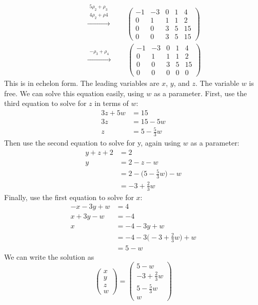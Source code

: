 \documentclass[11pt]{article}
\theoremstyle{definition}
\def\rowop#1{\qquad\xrightarrow{\begin{matrix}#1\end{matrix}}\qquad}
\begin{document}
\begin{align*}
  &\rowop{5\rho_2+\rho_3\\ 4\rho_2+\rho4}
    \left(\begin{array}{cccc|c}
      -1 &-3 & 0 & 1 & 4 \\
       0 & 1 & 1 & 1 & 2 \\
       0 & 0 & 3 & 5 & 15 \\
       0 & 0 & 3 & 5 & 15
    \end{array}\right) \\[15pt]
  &\rowop{-\rho_3+\rho_4}
    \left(\begin{array}{cccc|c}
      -1 &-3 & 0 & 1 & 4 \\
       0 & 1 & 1 & 1 & 2 \\
       0 & 0 & 3 & 5 & 15 \\
       0 & 0 & 0 & 0 & 0
    \end{array}\right)
\end{align*}
This is in echelon form.  The leading variables are $x$, $y$, and $z$.  The variable $w$ is free.
We can solve this equation easily, using $w$ as a parameter.  First, use the third equation to solve for $z$ in terms
of $w$:
\begin{align*}
    3z + 5w &= 15\\
    3z &= 15 - 5w\\
     z &= 5 -\frac{5}{3}w
\end{align*}
Then use the second equation to solve for y, again using $w$ as a parameter:
\begin{align*}
   y + z + 2 &= 2\\
   y &= 2 - z - w\\
     &= 2 - \big(5-\frac{5}{3}w\big) - w\\
     &= -3 + \frac{2}{3}w
\end{align*}
Finally, use the first equation to solve for $x$:
\begin{align*}
  -x - 3y + w &= 4\\
  x +3y - w &= -4\\
  x &= -4-3y+w\\
    &= -4 -3\big(-3+\frac{2}{3}w\big) + w\\
    &= 5 - w
\end{align*}
We can write the solution as
$$\begin{pmatrix} x \\ y \\ z \\ w\end{pmatrix} = \begin{pmatrix} 5 - w\\ -3 + \frac{2}{3}w \\ 5 - \frac{5}{3}w \\ w \end{pmatrix}$$
\end{document}
